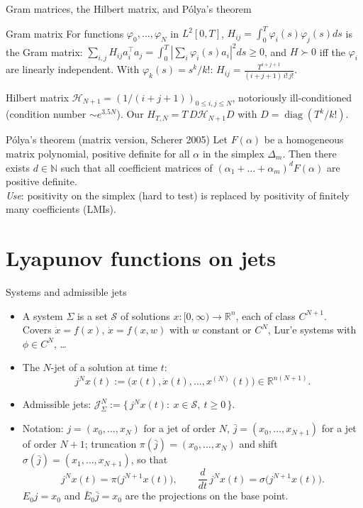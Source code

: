\documentclass[10pt,aspectratio=169]{beamer}
\newcommand{\R}{\mathbb{R}}
\newcommand{\N}{\mathbb{N}}
\newcommand{\Jet}{\mathcal{J}}
\newcommand{\tr}{^{\top}}
\newcommand{\Sol}{\mathcal{S}}
\DeclareMathOperator{\diag}{diag}
\begin{document}
\begin{frame}{Gram matrices, the Hilbert matrix, and P\'olya's theorem}
\begin{block}{Gram matrix}
For functions $\varphi_0,\dots,\varphi_N$ in $L^2[0,T]$, $H_{ij}=\int_0^T\varphi_i(s)\varphi_j(s)ds$ is the Gram matrix: $\sum_{i,j}H_{ij}a_i\tr a_j=\int_0^T|\sum_i\varphi_i(s)a_i|^2ds\ge0$, and $H\succ0$ iff the $\varphi_i$ are linearly independent. With $\varphi_k(s)=s^k/k!$: $H_{ij}=\frac{T^{i+j+1}}{(i+j+1)\,i!\,j!}$.
\end{block}
\begin{block}{Hilbert matrix}
$\mathcal H_{N+1}=(1/(i+j+1))_{0\le i,j\le N}$, notoriously ill-conditioned (condition number $\sim e^{3.5N}$). Our $H_{T,N}=T\,D\mathcal H_{N+1}D$ with $D=\diag(T^k/k!)$.
\end{block}
\begin{block}{P\'olya's theorem (matrix version, Scherer 2005)}
Let $F(\alpha)$ be a homogeneous matrix polynomial, positive definite for all $\alpha$ in the simplex $\Delta_m$. Then there exists $d\in\N$ such that all coefficient matrices of $(\alpha_1+\dots+\alpha_m)^dF(\alpha)$ are positive definite.\\
\emph{Use}: positivity on the simplex (hard to test) is replaced by positivity of finitely many coefficients (LMIs).
\end{block}
\end{frame}

\section{Lyapunov functions on jets}

\begin{frame}{Systems and admissible jets}
\begin{itemize}
\item A system $\Sigma$ is a set $\Sol$ of solutions $x:[0,\infty)\to\R^n$, each of class $C^{N+1}$.\\
Covers $\dot x=f(x)$, $\dot x=f(x,w)$ with $w$ constant or $C^N$, Lur'e systems with $\phi\in C^N$, \dots
\item The $N$-jet of a solution at time $t$:
\[
j^Nx(t):=\big(x(t),\dot x(t),\dots,x^{(N)}(t)\big)\in\R^{n(N+1)}.
\]
\item \alert{Admissible jets}: $\displaystyle \Jet^N_\Sigma:=\{\,j^Nx(t):\ x\in\Sol,\ t\ge0\,\}$.
\item Notation: $j=(x_0,\dots,x_N)$ for a jet of order $N$, $\bar j=(x_0,\dots,x_{N+1})$ for a jet of order $N+1$; \alert{truncation} $\pi(\bar j)=(x_0,\dots,x_N)$ and \alert{shift} $\sigma(\bar j)=(x_1,\dots,x_{N+1})$, so that
\[
j^Nx(t)=\pi\big(j^{N+1}x(t)\big),\qquad \frac{d}{dt}\,j^Nx(t)=\sigma\big(j^{N+1}x(t)\big).
\]
$E_0j=x_0$ and $\bar E_0\bar j=x_0$ are the projections on the base point.
\end{itemize}
\end{frame}
\end{document}

